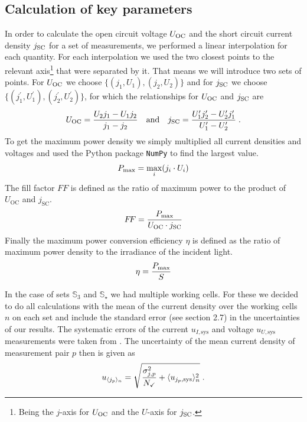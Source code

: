 \documentclass[a4paper,10pt,twocolumn]{article}
\begin{document}
\begin{extract*}
\subsection{Calculation of key parameters}\label{subsec:calckeyparams}
In order to calculate the open circuit voltage $U_{\text{OC}}$ and the short circuit current density $j_{\text{SC}}$ for a set of measurements, we performed a linear interpolation for each quantity. For each interpolation we used the two closest points to the relevant axis\footnote{Being the $j$-axis for $U_{\text{OC}}$ and the $U$-axis for $j_{\text{SC}}$.} that were separated by it.\mypar
That means we will introduce two sets of points. For $U_{\text{OC}}$ we choose $\{(j_1,U_1),(j_2,U_2)\}$ and for $j_{\text{SC}}$ we choose $\{(j_1^\prime,U_1^\prime),(j_2^\prime,U_2^\prime)\}$, for which the relationships for $U_{\text{OC}}$ and $j_{\text{SC}}$ are 
\begin{align}\label{eq:interpol}
	U_{\text{OC}} = \frac{U_2 j_1 - U_1 j_2}{j_1-j_2}\quad\text{and}\quad j_{\text{SC}} = \frac{U_1^\prime j_2^\prime - U_2^\prime j_1^\prime}{U_1^\prime-U_2^\prime}\;.
\end{align}
To get the maximum power density we simply multiplied all current densities and voltages and used the Python package \texttt{NumPy} to find the largest value.
\begin{align}
	P_{\text{max}} = \max_{i} (j_i\cdot U_i)
\end{align}
The fill factor $F\!F$ is defined as the ratio of maximum power to the product of $U_{\mathrm{OC}}$ and $j_{\mathrm{SC}}$.
\begin{align}
	F\!F = \frac{P_{\text{max}}}{U_{\text{OC}} \cdot j_{\text{SC}}}
\end{align}
Finally the maximum power conversion efficiency $\eta$ is defined as the ratio of maximum power density to the irradiance of the incident light.
\begin{align}
	\eta = \frac{P_{\text{max}}}{S}
\end{align}

In the case of sets $\mathbb{S}_3$ and $\mathbb{S}_\star$ we had multiple working cells. For these we decided to do all calculations with the mean of the current density over the working cells $n$ on each set and include the standard error (see \cite{measurements} section 2.7) in the uncertainties of our results. The systematic errors of the current $u_{I,\text{sys}}$ and voltage $u_{U,\text{sys}}$ measurements were taken from \cite{keithley}. The uncertainty of the mean current density of measurement pair $p$ then is given as
\begin{equation}\label{eq:jerr}
	u_{\langle j_p \rangle_n} = \sqrt{\frac{\sigma_{j,p}^2}{N_\checkmark} + \langle u_{j_p,\text{sys}} \rangle_n^2} \;.
\end{equation}


\end{extract*}
\end{document}
